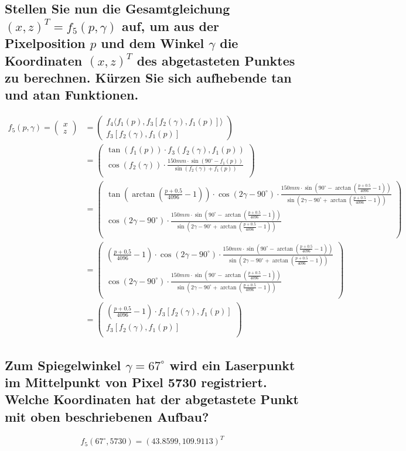 \documentclass[a4paper,10pt,DIV=14]{scrartcl}
\newcommand{\dg}[1]{#1^\circ}
\begin{document}
\subsection{Stellen Sie nun die Gesamtgleichung $(x,z)^T = f_5(p, \gamma)$ auf, um aus der Pixelposition $p$ und dem Winkel $\gamma$ die Koordinaten $(x, z)^T$ des abgetasteten Punktes zu berechnen. Kürzen Sie sich aufhebende tan und atan Funktionen.}
\newcommand{\fone}[1]{\arctan \left(\frac{#1 + 0.5}{4096} - 1 \right)}
\newcommand{\ftwo}[1]{2#1 - \dg{90}}
\newcommand{\fthree}[2]{\cos\left(#1\right) \cdot \frac{150mm \cdot \sin\left(\dg{90} - #2\right)}{\sin\left(#1 + #2\right)}}
\newcommand{\ffour}[2]{\tan\left(#1\right) \cdot #2}
\begin{align*}
f_5(p, \gamma) = \begin{pmatrix} x \\ z \end{pmatrix} &= \begin{pmatrix} f_4\langle f_1(p), f_3[f_2(\gamma), f_1(p)]\rangle \\ f_3[f_2(\gamma), f_1(p)] \end{pmatrix} \\
&= \begin{pmatrix} 
\ffour{f_1(p)}{f_3(f_2(\gamma), f_1(p))} \\
\fthree{f_2(\gamma)}{f_1(p)} \\
\end{pmatrix} \\
&= \begin{pmatrix} 
\ffour{\fone{p}}{\fthree{\ftwo{\gamma}}{\fone{p}}} \\
\fthree{\ftwo{\gamma}}{\fone{p}} \\
\end{pmatrix} \\
&= \begin{pmatrix}
\left(\frac{p + 0.5}{4096} - 1 \right) \cdot \fthree{\ftwo{\gamma}}{\fone{p}} \\
\fthree{\ftwo{\gamma}}{\fone{p}} \\
\end{pmatrix} \\
&= \begin{pmatrix}
\left(\frac{p + 0.5}{4096} - 1 \right) \cdot f_3[f_2(\gamma), f_1(p)] \\ f_3[f_2(\gamma), f_1(p)] \\
\end{pmatrix}
\end{align*}

\subsection{Zum Spiegelwinkel $\gamma = 67^\circ$ wird ein Laserpunkt im Mittelpunkt von Pixel 5730 registriert. Welche Koordinaten hat der abgetastete Punkt mit oben beschriebenen Aufbau?}
$$ f_5(\dg{67}, 5730) = (43.8599, 109.9113)^T $$
\end{document}
